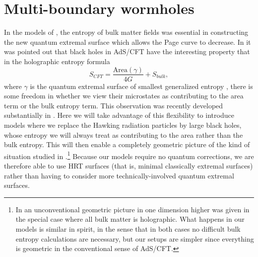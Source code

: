 \documentclass[12pt]{article}
\newcommand{\be}{\begin{equation}}
\newcommand{\ee}{\end{equation}}
\theoremstyle{definition}
\begin{document}
\section{Multi-boundary wormholes}
In the models of \cite{Almheiri:2019psf,Penington:2019npb,Almheiri:2019hni}, the entropy of bulk matter fields was essential in constructing the new quantum extremal surface which allows the Page curve to decrease.  In \cite{Harlow:2016vwg} it was pointed out that black holes in AdS/CFT have the interesting property that in the holographic entropy formula 
\be
S_{CFT}=\frac{\mathrm{Area}(\gamma)}{4G}+S_{bulk},
\ee
where $\gamma$ is the quantum extremal surface of smallest generalized entropy \cite{Ryu:2006bv, Hubeny:2007xt, Faulkner:2013ana, Engelhardt:2014gca}, there is some freedom in whether we view their microstates as contributing to the area term or the bulk entropy term. This observation was recently developed substantially in \cite{Hayden:2018khn,Akers:2019wxj}.  Here we will take advantage of this flexibility to introduce models where we replace the Hawking radiation particles by large black holes, whose entropy we will always treat as contributing to the area rather than the bulk entropy.  This will then enable a completely geometric picture of the kind of situation studied in \cite{Almheiri:2019psf,Penington:2019npb,Almheiri:2019hni}.\footnote{In \cite{Almheiri:2019hni} an unconventional geometric picture in one dimension higher was given in the special case where all bulk matter is holographic. What happens in our models is similar in spirit, in the sense that in both cases no difficult bulk entropy calculations are necessary, but our setups are simpler since everything is geometric in the conventional sense of AdS/CFT.} Because our models require no quantum corrections, we are therefore able to use HRT surfaces (that is, minimal classically extremal surfaces) rather than having to consider more technically-involved quantum extremal surfaces. 
\end{document}
